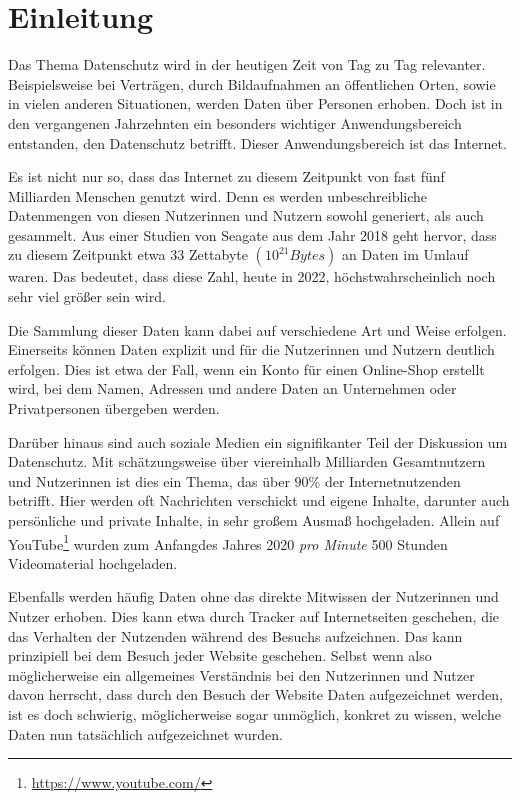 \section{Einleitung}

Das Thema Datenschutz wird in der heutigen Zeit von Tag zu Tag relevanter.
Beispielsweise bei Verträgen, durch Bildaufnahmen an öffentlichen Orten, sowie in vielen anderen 
Situationen, werden Daten über Personen erhoben.
Doch ist in den vergangenen Jahrzehnten ein besonders wichtiger Anwendungsbereich entstanden, den Datenschutz betrifft.
Dieser Anwendungsbereich ist das Internet.

Es ist nicht nur so, dass das Internet zu diesem Zeitpunkt von fast fünf Milliarden Menschen genutzt wird.\cite{kemp_digital_2022}
Denn es werden unbeschreibliche Datenmengen von diesen Nutzerinnen und Nutzern sowohl generiert, als auch gesammelt. 
Aus einer Studien von Seagate aus dem Jahr 2018 geht hervor, dass zu diesem Zeitpunkt etwa 33 Zettabyte $(10^{21} Bytes)$ an Daten im Umlauf waren.\cite{reinsel_digitization_2018}
Das bedeutet, dass diese Zahl, heute in 2022, höchstwahrscheinlich noch sehr viel größer sein wird.

Die Sammlung dieser Daten kann dabei auf verschiedene Art und Weise erfolgen.
Einerseits können Daten explizit und für die Nutzerinnen und Nutzern deutlich erfolgen. 
Dies ist etwa der Fall, wenn ein Konto für einen Online-Shop erstellt wird, bei dem Namen, Adressen und andere Daten an Unternehmen oder Privatpersonen übergeben werden. 

Darüber hinaus sind auch soziale Medien ein signifikanter Teil der Diskussion um Datenschutz.
Mit schätzungsweise über viereinhalb Milliarden Gesamtnutzern und Nutzerinnen\cite{kemp_digital_2022} ist dies ein Thema, das über $90\%$ der Internetnutzenden betrifft.  
Hier werden oft Nachrichten verschickt und eigene Inhalte, darunter auch persönliche und private Inhalte, in sehr großem Ausmaß hochgeladen. Allein auf YouTube\footnote{\url{https://www.youtube.com/}} wurden zum Anfangdes Jahres 2020 \emph{pro Minute} 500 Stunden Videomaterial hochgeladen.\cite{wojcicki_youtube_2020}

Ebenfalls werden häufig Daten ohne das direkte Mitwissen der Nutzerinnen und Nutzer erhoben.
Dies kann etwa durch Tracker auf Internetseiten geschehen, die das Verhalten der Nutzenden während des Besuchs aufzeichnen. 
Das kann prinzipiell bei dem Besuch jeder Website geschehen. 
Selbst wenn also möglicherweise ein allgemeines Verständnis bei den Nutzerinnen und Nutzer davon herrscht, dass durch den Besuch der Website Daten aufgezeichnet werden, 
ist es doch schwierig, möglicherweise sogar unmöglich, konkret zu wissen, welche Daten nun tatsächlich aufgezeichnet wurden.

